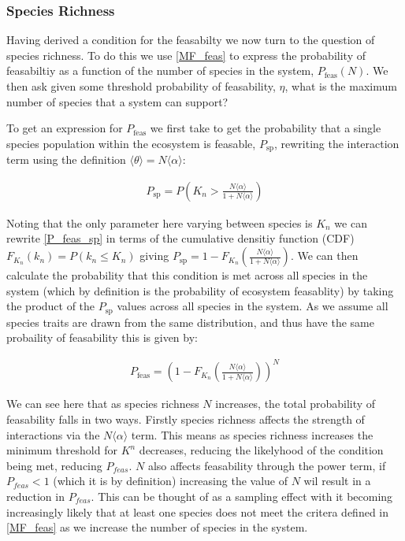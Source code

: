 \documentclass{article}
\begin{document}
\subsubsection{Species Richness}
Having derived a condition for the feasabilty we now turn to the question of species richness. To do this we use \cref{MF_feas} to express the probability of feasabiltiy as a function of the number of species in the system, $P_{\text{feas}}(N)$. We then ask given some threshold probability of feasability, $\eta$, what is the maximum number of species that a system can support?

To get an expression for $P_{\text{feas}}$ we first take  to get the probability that a single species population within the ecosystem is feasable, $P_{\text{sp}}$, rewriting the interaction term using the definition $\langle \theta \rangle = N \langle \alpha \rangle$:

\begin{align}
P_{\text{sp}} = P\left(K_n > \frac{N \langle \alpha \rangle}{1 + N \langle \alpha \rangle} \right) \label{P_feas_sp}
\end{align}

Noting that the only parameter here varying between species is $K_n$ we can rewrite \cref{P_feas_sp} in terms of the cumulative densitiy function (CDF) $F_{K_n}(k_n) = P(k_n \leq K_n)$ giving $P_{\text{sp}} = 1 - F_{K_n}\left(\frac{N \langle \alpha \rangle}{1 + N \langle \alpha \rangle}\right)$. We can then calculate the probability that this condition is met across all species in the system (which by definition is the probability of ecosystem feasablity) by taking the product of the $P_{\text{sp}}$ values across all species in the system. As we assume all species traits are drawn from the same distribution, and thus have the same probaility of feasability this is given by:

\begin{align}
  P_{\text{feas}} = \left( 1 - F_{K_n}\left(\frac{N \langle \alpha \rangle}{1 + N \langle \alpha \rangle }\right) \right)^N \label{P_feas}
\end{align}

We can see here that as species richness $N$ increases, the total probability of feasability falls in two ways. Firstly species richness affects the strength of interactions via the $N \langle \alpha \rangle$ term. This means as species richness increases the minimum threshold for $K^n$ decreases, reducing the likelyhood of the condition being met, reducing $P_{feas}$. $N$ also affects feasability through the power term, if $P_{feas} < 1$ (which it is by definition) increasing the value of $N$ wil result in a reduction in $P_{feas}$. This can be thought of as a sampling effect with it becoming increasingly likely that at least one species does not meet the critera defined in \cref{MF_feas} as we increase the number of species in the system.
\end{document}
